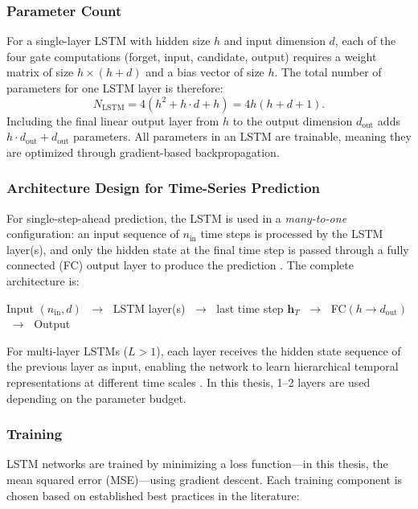 \subsubsection{Parameter Count}

For a single-layer LSTM with hidden size $h$ and input dimension $d$, each of the four gate computations (forget, input, candidate, output) requires a weight matrix of size $h \times (h + d)$ and a bias vector of size $h$. The total number of parameters for one LSTM layer is therefore:
\begin{equation}
    N_{\text{LSTM}} = 4 \left( h^2 + h \cdot d + h \right) = 4h(h + d + 1).
    \label{eq:lstm_params}
\end{equation}
Including the final linear output layer from $h$ to the output dimension $d_{\text{out}}$ adds $h \cdot d_{\text{out}} + d_{\text{out}}$ parameters. All parameters in an LSTM are trainable, meaning they are optimized through gradient-based backpropagation.

\subsubsection{Architecture Design for Time-Series Prediction}

For single-step-ahead prediction, the LSTM is used in a \emph{many-to-one} configuration: an input sequence of $n_{\text{in}}$ time steps is processed by the LSTM layer(s), and only the hidden state at the final time step is passed through a fully connected (FC) output layer to produce the prediction \cite{goodfellow2016deep}. The complete architecture is:
\begin{center}
Input $(n_{\text{in}}, d)$ $\;\to\;$ LSTM layer(s) $\;\to\;$ last time step $\mathbf{h}_T$ $\;\to\;$ FC$(h \to d_{\text{out}})$ $\;\to\;$ Output
\end{center}

For multi-layer LSTMs ($L > 1$), each layer receives the hidden state sequence of the previous layer as input, enabling the network to learn hierarchical temporal representations at different time scales \cite{hermans2013training}. In this thesis, 1--2 layers are used depending on the parameter budget.

\subsubsection{Training}

LSTM networks are trained by minimizing a loss function---in this thesis, the mean squared error (MSE)---using gradient descent. Each training component is chosen based on established best practices in the literature:

